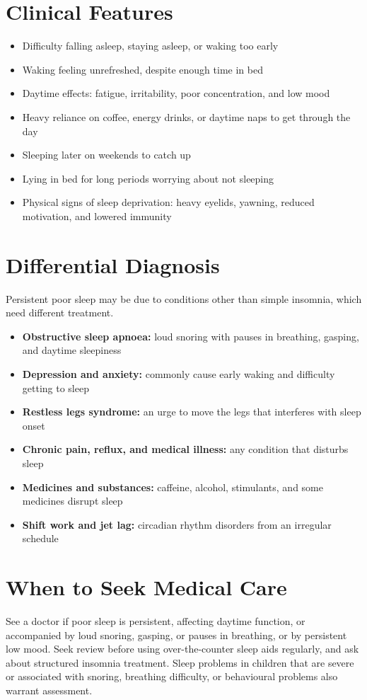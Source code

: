 \section*{Clinical Features}
\begin{itemize}
    \item Difficulty falling asleep, staying asleep, or waking too early
    \item Waking feeling unrefreshed, despite enough time in bed
    \item Daytime effects: fatigue, irritability, poor concentration, and low mood
    \item Heavy reliance on coffee, energy drinks, or daytime naps to get through the day
    \item Sleeping later on weekends to catch up
    \item Lying in bed for long periods worrying about not sleeping
    \item Physical signs of sleep deprivation: heavy eyelids, yawning, reduced motivation, and lowered immunity
\end{itemize}

\section*{Differential Diagnosis}
Persistent poor sleep may be due to conditions other than simple insomnia, which need different treatment.
\begin{itemize}
    \item \textbf{Obstructive sleep apnoea:} loud snoring with pauses in breathing, gasping, and daytime sleepiness
    \item \textbf{Depression and anxiety:} commonly cause early waking and difficulty getting to sleep
    \item \textbf{Restless legs syndrome:} an urge to move the legs that interferes with sleep onset
    \item \textbf{Chronic pain, reflux, and medical illness:} any condition that disturbs sleep
    \item \textbf{Medicines and substances:} caffeine, alcohol, stimulants, and some medicines disrupt sleep
    \item \textbf{Shift work and jet lag:} circadian rhythm disorders from an irregular schedule
\end{itemize}

\section*{When to Seek Medical Care}
See a doctor if poor sleep is persistent, affecting daytime function, or accompanied by loud snoring, gasping, or pauses in breathing, or by persistent low mood. Seek review before using over-the-counter sleep aids regularly, and ask about structured insomnia treatment. Sleep problems in children that are severe or associated with snoring, breathing difficulty, or behavioural problems also warrant assessment.

